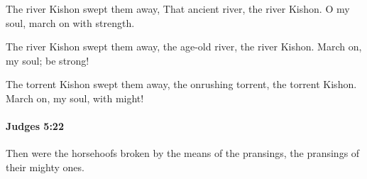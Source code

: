 			\begin{versebox}
					\item[BHS] 
					\item[ASV] The river Kishon swept them away, That ancient river, the river Kishon. O my soul, march on with strength.
					\item[NIV] The river Kishon swept them away, the age-old river, the river Kishon. March on, my soul; be strong!
					\item[NRSV] The torrent Kishon swept them away, the onrushing torrent, the torrent Kishon. March on, my soul, with might!
			\end{versebox}

		\paragraph{Judges 5:22} %
			\label{JUDGES-5-22}

			Then were the horsehoofs broken by the means of the pransings, the pransings of their mighty ones.

